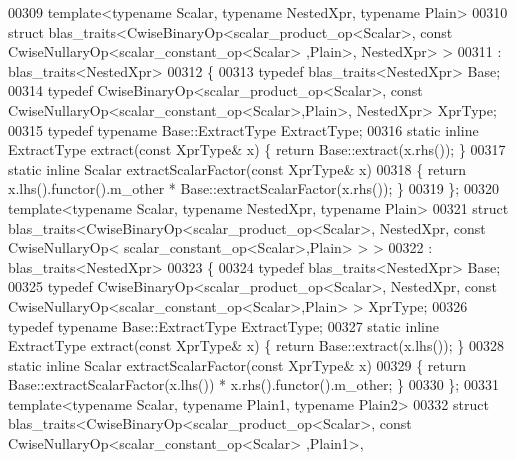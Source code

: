 \begin{DoxyCode}
00309 \textcolor{keyword}{template}<\textcolor{keyword}{typename} Scalar, \textcolor{keyword}{typename} NestedXpr, \textcolor{keyword}{typename} Plain>
00310 \textcolor{keyword}{struct }blas\_traits<CwiseBinaryOp<scalar\_product\_op<Scalar>, const CwiseNullaryOp<scalar\_constant\_op<Scalar>
      ,Plain>, NestedXpr> >
00311  : blas\_traits<NestedXpr>
00312 \{
00313   \textcolor{keyword}{typedef} blas\_traits<NestedXpr> Base;
00314   \textcolor{keyword}{typedef} CwiseBinaryOp<scalar\_product\_op<Scalar>, \textcolor{keyword}{const} CwiseNullaryOp<scalar\_constant\_op<Scalar>,Plain>, 
      NestedXpr> XprType;
00315   \textcolor{keyword}{typedef} \textcolor{keyword}{typename} Base::ExtractType ExtractType;
00316   \textcolor{keyword}{static} \textcolor{keyword}{inline} ExtractType extract(\textcolor{keyword}{const} XprType& x) \{ \textcolor{keywordflow}{return} Base::extract(x.rhs()); \}
00317   \textcolor{keyword}{static} \textcolor{keyword}{inline} Scalar extractScalarFactor(\textcolor{keyword}{const} XprType& x)
00318   \{ \textcolor{keywordflow}{return} x.lhs().functor().m\_other * Base::extractScalarFactor(x.rhs()); \}
00319 \};
00320 \textcolor{keyword}{template}<\textcolor{keyword}{typename} Scalar, \textcolor{keyword}{typename} NestedXpr, \textcolor{keyword}{typename} Plain>
00321 \textcolor{keyword}{struct }blas\_traits<CwiseBinaryOp<scalar\_product\_op<Scalar>, NestedXpr, const CwiseNullaryOp<
      scalar\_constant\_op<Scalar>,Plain> > >
00322  : blas\_traits<NestedXpr>
00323 \{
00324   \textcolor{keyword}{typedef} blas\_traits<NestedXpr> Base;
00325   \textcolor{keyword}{typedef} CwiseBinaryOp<scalar\_product\_op<Scalar>, NestedXpr, \textcolor{keyword}{const} 
      CwiseNullaryOp<scalar\_constant\_op<Scalar>,Plain> > XprType;
00326   \textcolor{keyword}{typedef} \textcolor{keyword}{typename} Base::ExtractType ExtractType;
00327   \textcolor{keyword}{static} \textcolor{keyword}{inline} ExtractType extract(\textcolor{keyword}{const} XprType& x) \{ \textcolor{keywordflow}{return} Base::extract(x.lhs()); \}
00328   \textcolor{keyword}{static} \textcolor{keyword}{inline} Scalar extractScalarFactor(\textcolor{keyword}{const} XprType& x)
00329   \{ \textcolor{keywordflow}{return} Base::extractScalarFactor(x.lhs()) * x.rhs().functor().m\_other; \}
00330 \};
00331 \textcolor{keyword}{template}<\textcolor{keyword}{typename} Scalar, \textcolor{keyword}{typename} Plain1, \textcolor{keyword}{typename} Plain2>
00332 \textcolor{keyword}{struct }blas\_traits<CwiseBinaryOp<scalar\_product\_op<Scalar>, const CwiseNullaryOp<scalar\_constant\_op<Scalar>
      ,Plain1>,

\end{DoxyCode}
